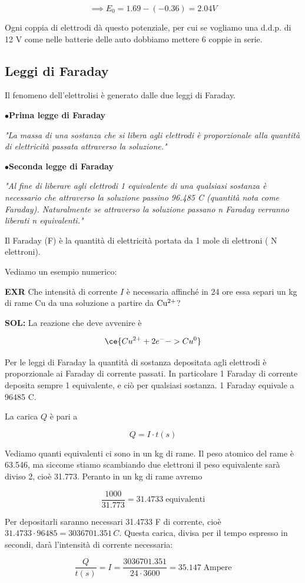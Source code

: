 $$\implies E_0=1.69 - (-0.36)=2.04V$$

Ogni coppia di elettrodi dà questo potenziale, per cui se vogliamo una d.d.p. di 12 V come nelle batterie delle auto dobbiamo mettere 6 coppie in serie.
\subsection{Leggi di Faraday}
Il fenomeno dell'elettrolisi è generato dalle due leggi di Faraday.

\vspace{0.2cm}$\bullet$\textbf{Prima legge di Faraday}

\vspace{0.2cm}\textit{"La massa di una sostanza che si libera agli elettrodi è proporzionale alla quantità di elettricità passata attraverso la soluzione."}

\vspace{0.2cm}$\bullet$\textbf{Seconda legge di Faraday}

\vspace{0.2cm}\textit{"Al fine di liberare agli elettrodi 1 equivalente di una qualsiasi sostanza è necessario che attraverso la soluzione passino 96.485 C (quantità nota come Faraday). Naturalmente se attraverso la soluzione passano n Faraday verranno liberati n equivalenti."}

\vspace{0.2cm}Il Faraday (F) è la quantità di elettricità portata da 1 mole di elettroni ( N elettroni).

Vediamo un esempio numerico:

\vspace{0.2cm}\textbf{EXR} Che intensità di corrente $I$ è necessaria affinché in 24 ore essa separi un kg di rame Cu da una soluzione a partire da $\rm Cu^{2+}$?

\vspace{0.2cm}\textbf{SOL:} La reazione che deve avvenire è

$$\ce{Cu^{2+} + 2e^- -> Cu^0}$$

Per le leggi di Faraday la quantità di sostanza depositata agli elettrodi è proporzionale ai Faraday di corrente passati. In particolare 1 Faraday di corrente deposita sempre 1 equivalente, e ciò per qualsiasi sostanza. 1 Faraday equivale a 96485 C.

La carica $Q$ è pari a

$$Q=I \cdot t(s)$$

Vediamo quanti equivalenti ci sono in un kg di rame. Il peso atomico del rame è 63.546, ma siccome stiamo scambiando due elettroni il peso equivalente sarà diviso 2, cioè 31.773. Peranto in un kg di rame avremo

$$\frac{1000}{31.773} = 31.4733 \; \text{equivalenti}$$

Per depositarli saranno necessari 31.4733 F di corrente, cioè $31.4733 \cdot 96485 = 3036701.351 \, C$. Questa carica, divisa per il tempo espresso in secondi, darà l'intensità di corrente necessaria:

$$\frac{Q}{t(s)} = I = \frac{3036701.351}{24 \cdot 3600} = 35.147 \; \text{Ampere}$$
